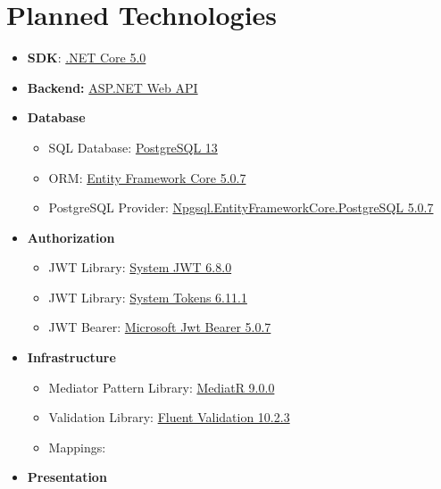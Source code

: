 \section{Planned Technologies}\label{sec:planned-technologies}
\begin{itemize}
    \item \textbf{SDK}: \href{https://dotnet.microsoft.com/download/dotnet/5.0}{.NET Core 5.0}
    \item \textbf{Backend:} \href{https://dotnet.microsoft.com/apps/aspnet}{ASP.NET Web API}
    \item \textbf{Database}
    \begin{itemize}
        \item SQL Database: \href{https://www.postgresql.org/}{PostgreSQL 13}
        \item ORM: \href{https://www.nuget.org/packages/Microsoft.EntityFrameworkCore/5.0.7?_src=template}{Entity Framework Core 5.0.7}
        \item PostgreSQL Provider: \href{https://www.nuget.org/packages/Npgsql.EntityFrameworkCore.PostgreSQL/5.0.7?_src=template}{Npgsql.EntityFrameworkCore.PostgreSQL 5.0.7}
    \end{itemize}
    \item \textbf{Authorization}
    \begin{itemize}
        \item JWT Library: \href{https://www.nuget.org/packages/System.IdentityModel.Tokens.Jwt}{System JWT 6.8.0}
        \item JWT Library: \href{https://www.nuget.org/packages/System.IdentityModel.Tokens}{System Tokens 6.11.1}
        \item JWT Bearer: \href{https://www.nuget.org/packages/Microsoft.AspNetCore.Authentication.JwtBearer/5.0.7?_src=template}{Microsoft Jwt Bearer 5.0.7}
    \end{itemize}
    \item \textbf{Infrastructure}
    \begin{itemize}
        \item Mediator Pattern Library: \href{https://www.nuget.org/packages/MediatR/9.0.0?_src=template}{MediatR 9.0.0}
        \item Validation Library: \href{https://www.nuget.org/packages/FluentValidation/10.2.3?_src=template}{Fluent Validation 10.2.3}
        \item Mappings:
    \end{itemize}
    \item \textbf{Presentation}

\end{itemize}
